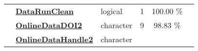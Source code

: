 \documentclass[]{article}
\begin{document}
\begin{longtable}[]{@{}lllrcl@{}}
\begin{minipage}[t]{0.07\columnwidth}\raggedright\strut
\strut
\end{minipage} & \begin{minipage}[t]{0.35\columnwidth}\raggedright\strut
\textbf{\protect\hyperlink{datarunclean}{DataRunClean}}\strut
\end{minipage} & \begin{minipage}[t]{0.11\columnwidth}\raggedright\strut
logical\strut
\end{minipage} & \begin{minipage}[t]{0.10\columnwidth}\raggedleft\strut
1\strut
\end{minipage} & \begin{minipage}[t]{0.10\columnwidth}\centering\strut
100.00 \%\strut
\end{minipage} & \begin{minipage}[t]{0.12\columnwidth}\raggedright\strut
\strut
\end{minipage}\tabularnewline
\begin{minipage}[t]{0.07\columnwidth}\raggedright\strut
\strut
\end{minipage} & \begin{minipage}[t]{0.35\columnwidth}\raggedright\strut
\textbf{\protect\hyperlink{onlinedatadoi2}{OnlineDataDOI2}}\strut
\end{minipage} & \begin{minipage}[t]{0.11\columnwidth}\raggedright\strut
character\strut
\end{minipage} & \begin{minipage}[t]{0.10\columnwidth}\raggedleft\strut
9\strut
\end{minipage} & \begin{minipage}[t]{0.10\columnwidth}\centering\strut
98.83 \%\strut
\end{minipage} & \begin{minipage}[t]{0.12\columnwidth}\raggedright\strut
\strut
\end{minipage}\tabularnewline
\begin{minipage}[t]{0.07\columnwidth}\raggedright\strut
\strut
\end{minipage} & \begin{minipage}[t]{0.35\columnwidth}\raggedright\strut
\textbf{\protect\hyperlink{onlinedatahandle2}{OnlineDataHandle2}}\strut
\end{minipage} & \begin{minipage}[t]{0.11\columnwidth}\raggedright\strut
character\strut
\end{minipage} & \begin{minipage}[t]{0.10\columnwidth}\raggedleft\strut

\end{minipage}
\end{longtable}
\end{document}
